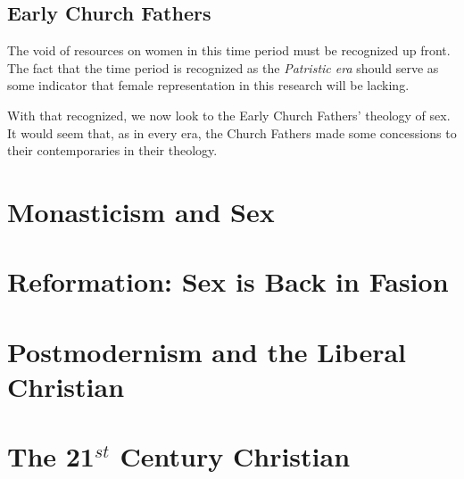 \documentclass{article}
\begin{document}
\subsection{Early Church Fathers}
    
    \par The void of resources on women in this time period must be recognized
        up front. The fact that the time period is recognized as the \textit{
        Patristic era} should serve as some indicator that female representation
        in this research will be lacking.

    \par With that recognized, we now look to the Early Church Fathers'
        theology of sex. It would seem that, as in every era, the Church
        Fathers made some concessions to their contemporaries in their
        theology. 


\section{Monasticism and Sex}
\section{Reformation: Sex is Back in Fasion}
\section{Postmodernism and the Liberal Christian}
\section{The 21$^{st}$ Century Christian}

  

\end{document}

